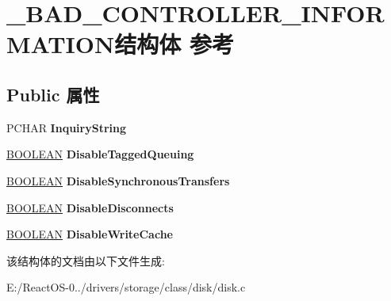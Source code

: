 \hypertarget{struct___b_a_d___c_o_n_t_r_o_l_l_e_r___i_n_f_o_r_m_a_t_i_o_n}{}\section{\+\_\+\+B\+A\+D\+\_\+\+C\+O\+N\+T\+R\+O\+L\+L\+E\+R\+\_\+\+I\+N\+F\+O\+R\+M\+A\+T\+I\+O\+N结构体 参考}
\label{struct___b_a_d___c_o_n_t_r_o_l_l_e_r___i_n_f_o_r_m_a_t_i_o_n}
\subsection*{Public 属性}
\begin{DoxyCompactItemize}
\item 
\mbox{\label{struct___b_a_d___c_o_n_t_r_o_l_l_e_r___i_n_f_o_r_m_a_t_i_o_n_a8fc28e79cacdc92147921eb49848ec86}} 
P\+C\+H\+AR {\bfseries Inquiry\+String}
\item 
\mbox{\label{struct___b_a_d___c_o_n_t_r_o_l_l_e_r___i_n_f_o_r_m_a_t_i_o_n_ac68a6a3bbc939c5d285ac7835fb836d4}} 
\hyperlink{_processor_bind_8h_a112e3146cb38b6ee95e64d85842e380a}{B\+O\+O\+L\+E\+AN} {\bfseries Disable\+Tagged\+Queuing}
\item 
\mbox{\label{struct___b_a_d___c_o_n_t_r_o_l_l_e_r___i_n_f_o_r_m_a_t_i_o_n_a3eed66cb4589d3f06bfb4ffe83ab6381}} 
\hyperlink{_processor_bind_8h_a112e3146cb38b6ee95e64d85842e380a}{B\+O\+O\+L\+E\+AN} {\bfseries Disable\+Synchronous\+Transfers}
\item 
\mbox{\label{struct___b_a_d___c_o_n_t_r_o_l_l_e_r___i_n_f_o_r_m_a_t_i_o_n_a3ee56cee67945259b523c409fc205b21}} 
\hyperlink{_processor_bind_8h_a112e3146cb38b6ee95e64d85842e380a}{B\+O\+O\+L\+E\+AN} {\bfseries Disable\+Disconnects}
\item 
\mbox{\label{struct___b_a_d___c_o_n_t_r_o_l_l_e_r___i_n_f_o_r_m_a_t_i_o_n_a2e7e0f5a57b5758d638a522af9a72670}} 
\hyperlink{_processor_bind_8h_a112e3146cb38b6ee95e64d85842e380a}{B\+O\+O\+L\+E\+AN} {\bfseries Disable\+Write\+Cache}
\end{DoxyCompactItemize}


该结构体的文档由以下文件生成\+:\begin{DoxyCompactItemize}
\item 
E\+:/\+React\+O\+S-\/0../drivers/storage/class/disk/disk.\+c\end{DoxyCompactItemize}
